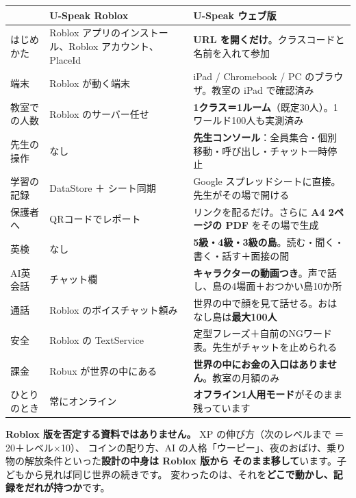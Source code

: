 \documentclass[a4paper,10.5pt]{article}
\begin{document}
\begin{center}
\footnotesize
\begin{tabular}{@{}p{} p{} p{}@{}}
\toprule
 & \textbf{U-Speak Roblox} & \textbf{U-Speak ウェブ版} \\
\midrule
はじめかた & Roblox アプリのインストール、Roblox アカウント、PlaceId & \textbf{URL を開くだけ}。クラスコードと名前を入れて参加 \\
端末 & Roblox が動く端末 & iPad / Chromebook / PC のブラウザ。教室の iPad で確認済み \\
教室での人数 & Roblox のサーバー任せ & \textbf{1クラス＝1ルーム}（既定30人）。1ワールド100人も実測済み \\
先生の操作 & なし & \textbf{先生コンソール}：全員集合・個別移動・呼び出し・チャット一時停止 \\
学習の記録 & DataStore ＋ シート同期 & Google スプレッドシートに直接。先生がその場で開ける \\
保護者へ & QRコードでレポート & リンクを配るだけ。さらに \textbf{A4 2ページの PDF} をその場で生成 \\
英検 & なし & \textbf{5級・4級・3級の島}。読む・聞く・書く・話す＋面接の間 \\
AI英会話 & チャット欄 & \textbf{キャラクターの動画つき}。声で話し、島の4場面＋おつかい島10か所 \\
通話 & Roblox のボイスチャット頼み & 世界の中で顔を見て話せる。おはなし島は\textbf{最大100人} \\
安全 & Roblox の TextService & 定型フレーズ＋自前のNGワード表。先生がチャットを止められる \\
課金 & Robux が世界の中にある & \textbf{世界の中にお金の入口はありません}。教室の月額のみ \\
ひとりのとき & 常にオンライン & \textbf{オフライン1人用モード}がそのまま残っています \\
\bottomrule
\end{tabular}
\end{center}

\begin{notebox}
\textbf{Roblox 版を否定する資料ではありません。} XP の伸び方（次のレベルまで ＝ 20＋レベル×10）、
コインの配り方、AI の人格「ウーピー」、夜のおばけ、乗り物の解放条件といった\textbf{設計の中身は
Roblox 版から そのまま移して}います。子どもから見れば同じ世界の続きです。
変わったのは、それを\textbf{どこで動かし、記録をだれが持つか}です。
\end{notebox}

\clearpage
\end{document}

